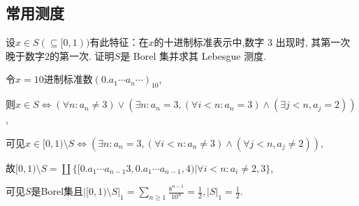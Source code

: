 \subsection{常用测度}
\begin{1}
设$x\in S(\subseteq[0,1))$有此特征：在$x$的十进制标准表示中,数字 $3$ 出现时,
其第一次晚于数字$2$的第一次. 证明$S$是 Borel 集并求其 Lebesgue 测度.
\end{1}   
\begin{solution}
令$x=10$进制标准数$(0.a_{1}\cdots a_{n}\cdots)_{10}$,

则$x\in S\Leftrightarrow(\forall n:a_{n}\neq3)\lor\left(\exists n:a_{n}=3,(\forall i<n:a_n=3)\land(\exists j<n,a_j=2)\right)$,

可见$x\in[0,1)\setminus S\Leftrightarrow\left(\exists n:a_{n}=3,(\forall i<n:a_{n}\neq3)\land(\forall j<n,a_{j}\ne2)\right)$,

故$[0,1)\setminus S=\coprod\{[0.a_{1}\cdots a_{n-1}3,0.a_1\cdots a_{n-1},4)|\forall i<n:a_{i}\neq2,3\}$,

可见$S$是Borel集且$|[0,1)\setminus S|_1=\sum\limits_{n\geqslant1}\frac{8^{n-1}}{10^{n}}=\frac{1}{2},|S|_{1}=\frac{1}{2}.$
\end{solution}



